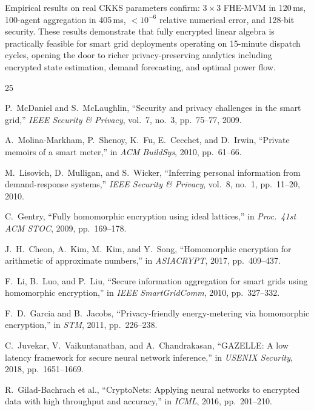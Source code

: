 \documentclass[conference]{IEEEtran}
\begin{document}
Empirical results on real CKKS parameters confirm: $3{\times}3$ FHE-MVM in 120\,ms, 100-agent aggregation in 405\,ms, $<10^{-6}$ relative numerical error, and 128-bit security. These results demonstrate that fully encrypted linear algebra is practically feasible for smart grid deployments operating on 15-minute dispatch cycles, opening the door to richer privacy-preserving analytics including encrypted state estimation, demand forecasting, and optimal power flow.

\begin{thebibliography}{25}

P.~McDaniel and S.~McLaughlin, ``Security and privacy challenges in the smart grid,'' \emph{IEEE Security \& Privacy}, vol.~7, no.~3, pp.~75--77, 2009.

A.~Molina-Markham, P.~Shenoy, K.~Fu, E.~Cecchet, and D.~Irwin, ``Private memoirs of a smart meter,'' in \emph{ACM BuildSys}, 2010, pp.~61--66.

M.~Lisovich, D.~Mulligan, and S.~Wicker, ``Inferring personal information from demand-response systems,'' \emph{IEEE Security \& Privacy}, vol.~8, no.~1, pp.~11--20, 2010.

C.~Gentry, ``Fully homomorphic encryption using ideal lattices,'' in \emph{Proc.\ 41st ACM STOC}, 2009, pp.~169--178.

J.~H.~Cheon, A.~Kim, M.~Kim, and Y.~Song, ``Homomorphic encryption for arithmetic of approximate numbers,'' in \emph{ASIACRYPT}, 2017, pp.~409--437.

F.~Li, B.~Luo, and P.~Liu, ``Secure information aggregation for smart grids using homomorphic encryption,'' in \emph{IEEE SmartGridComm}, 2010, pp.~327--332.

F.~D.~Garcia and B.~Jacobs, ``Privacy-friendly energy-metering via homomorphic encryption,'' in \emph{STM}, 2011, pp.~226--238.

C.~Juvekar, V.~Vaikuntanathan, and A.~Chandrakasan, ``GAZELLE: A low latency framework for secure neural network inference,'' in \emph{USENIX Security}, 2018, pp.~1651--1669.

R.~Gilad-Bachrach et al., ``CryptoNets: Applying neural networks to encrypted data with high throughput and accuracy,'' in \emph{ICML}, 2016, pp.~201--210.


\end{thebibliography}
\end{document}
